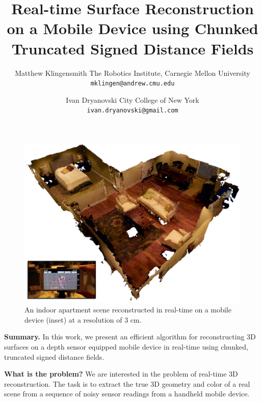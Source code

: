 \documentclass[conference,letterpaper]{IEEEtran}
\begin{document}
{\title{
Real-time Surface Reconstruction on a Mobile Device using Chunked Truncated
Signed Distance Fields }}
\author
{
	\IEEEauthorblockN
	{
		Matthew Klingensmith 
	}
	\IEEEauthorblockA
	{
		The Robotics Institute, Carnegie Mellon University\\
		\texttt{mklingen@andrew.cmu.edu}
	}
	\and
	\IEEEauthorblockN
	{
		Ivan Dryanovski
	}
	\IEEEauthorblockA
	{
		 City College of New York\\
		\texttt{ivan.dryanovski@gmail.com}
	}	
}

\maketitle

\begin{figure}[!t]
\centering
\includegraphics[width=\columnwidth]{img/fancycomposite}
\caption{An indoor apartment scene reconstructed in real-time on a mobile device
(inset) at a resolution of 3 cm.}
\label{fig:best}
\end{figure}

\textbf{Summary.}
In this work, we present an efficient algorithm for reconstructing 3D surfaces
on a depth sensor equipped mobile device in real-time using chunked, truncated
signed distance fields. 

\textbf{What is the problem?} 
We are interested in the problem of real-time 3D reconstruction. The task is to
extract the true 3D geometry and color of a real scene from a sequence of noisy
sensor readings from a handheld mobile device.
\end{document}
